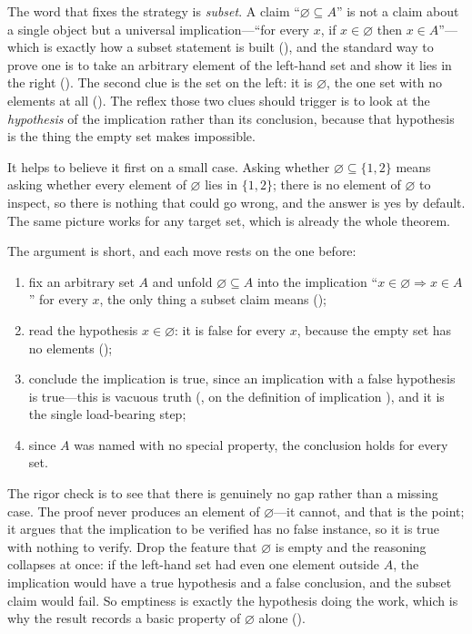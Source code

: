 \documentclass[main.tex]{subfiles}
\begin{document}
\begin{Reflection}
The word that fixes the strategy is \emph{subset}. A claim ``$\varnothing\subseteq A$'' is not a claim
about a single object but a universal implication---``for every $x$, if $x\in\varnothing$ then $x\in
A$''---which is exactly how a subset statement is built (), and the standard way to prove
one is to take an arbitrary element of the left-hand set and show it lies in the right
(). The second clue is the set on the left: it is $\varnothing$, the one set with no
elements at all (). The reflex those two clues should trigger is to look at the
\emph{hypothesis} of the implication rather than its conclusion, because that hypothesis is the thing
the empty set makes impossible.

It helps to believe it first on a small case. Asking whether $\varnothing\subseteq\{1,2\}$ means asking
whether every element of $\varnothing$ lies in $\{1,2\}$; there is no element of $\varnothing$ to
inspect, so there is nothing that could go wrong, and the answer is yes by default. The same picture
works for any target set, which is already the whole theorem.

The argument is short, and each move rests on the one before:
\begin{enumerate}[leftmargin=1.7em,itemsep=3pt,topsep=2pt,label=\textnormal{(\arabic*)}]
  \item fix an arbitrary set $A$ and unfold $\varnothing\subseteq A$ into the implication ``$x\in
        \varnothing\Rightarrow x\in A$'' for every $x$, the only thing a subset claim means
        ();
  \item read the hypothesis $x\in\varnothing$: it is false for every $x$, because the empty set has no
        elements ();
  \item conclude the implication is true, since an implication with a false hypothesis is true---this is
        vacuous truth (, on the definition of implication ), and it is the
        single load-bearing step;
  \item since $A$ was named with no special property, the conclusion holds for every set.
\end{enumerate}

The rigor check is to see that there is genuinely no gap rather than a missing case. The proof never
produces an element of $\varnothing$---it cannot, and that is the point; it argues that the implication
to be verified has no false instance, so it is true with nothing to verify. Drop the feature that
$\varnothing$ is empty and the reasoning collapses at once: if the left-hand set had even one element
outside $A$, the implication would have a true hypothesis and a false conclusion, and the subset claim
would fail. So emptiness is exactly the hypothesis doing the work, which is why the result records a
basic property of $\varnothing$ alone ().


\end{Reflection}
\end{document}

